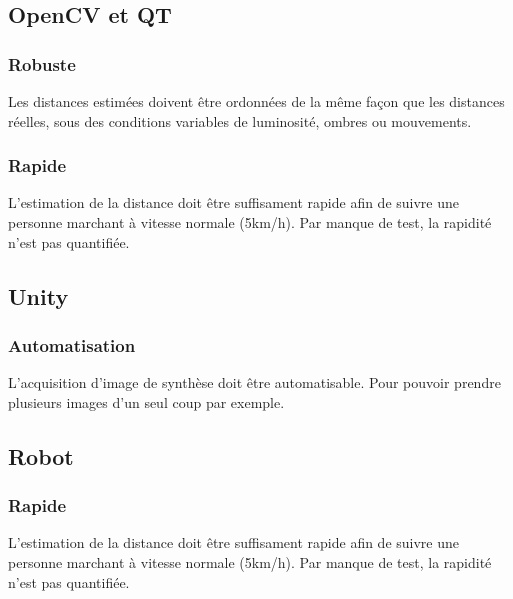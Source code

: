 \documentclass[a4paper]{article}
\begin{document}
\subsection*{OpenCV et QT}

\subsubsection*{Robuste}

Les distances estimées doivent être ordonnées de la même façon que les distances
réelles, sous des conditions variables de luminosité, ombres ou mouvements.

\subsubsection*{Rapide}

L'estimation de la distance doit être suffisament rapide afin de suivre une personne
marchant à vitesse normale (5km/h). Par manque de test, la rapidité n'est pas quantifiée.

\subsection*{Unity}

\subsubsection*{Automatisation}

L'acquisition d'image de synthèse doit être automatisable. Pour pouvoir prendre
plusieurs images d'un seul coup par exemple.

\subsection*{Robot}

\subsubsection*{Rapide}

L'estimation de la distance doit être suffisament rapide afin de suivre une personne
marchant à vitesse normale (5km/h). Par manque de test, la rapidité n'est pas quantifiée.

\end{document}
